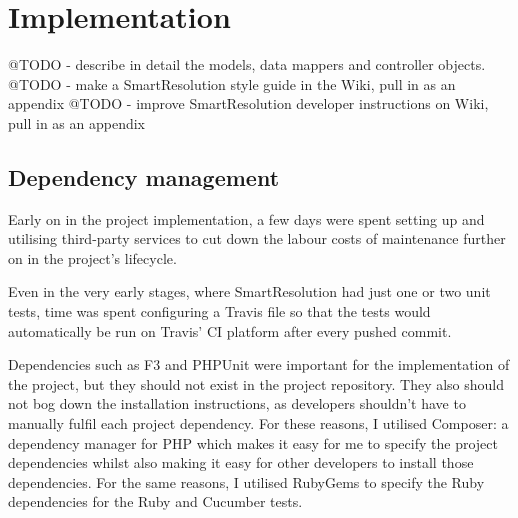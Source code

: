 \chapter{Implementation} %

@TODO - describe in detail the models, data mappers and controller objects.
@TODO - make a SmartResolution style guide in the Wiki, pull in as an appendix
@TODO - improve SmartResolution developer instructions on Wiki, pull in as an appendix

\section{Dependency management}

Early on in the project implementation, a few days were spent setting up and utilising third-party services to cut down the labour costs of maintenance further on in the project's lifecycle.

Even in the very early stages, where SmartResolution had just one or two unit tests, time was spent configuring a Travis file so that the tests would automatically be run on Travis' CI platform after every pushed commit.

Dependencies such as F3 and PHPUnit were important for the implementation of the project, but they should not exist in the project repository. They also should not bog down the installation instructions, as developers shouldn't have to manually fulfil each project dependency. For these reasons, I utilised Composer: a dependency manager for PHP which makes it easy for me to specify the project dependencies whilst also making it easy for other developers to install those dependencies. For the same reasons, I utilised RubyGems to specify the Ruby dependencies for the Ruby and Cucumber tests.

